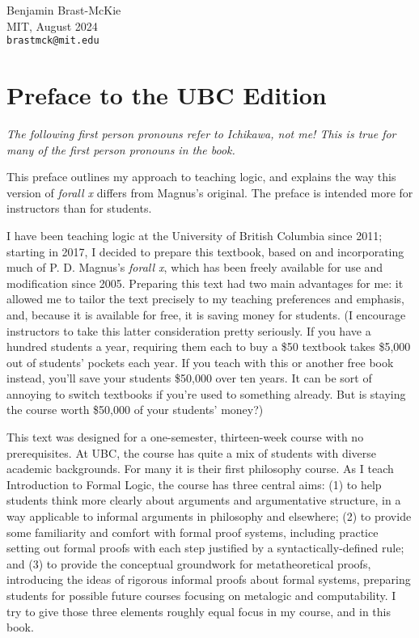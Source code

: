 \begin{flushright}
\textsf{Benjamin Brast-McKie} \\
\textsf{MIT, August 2024} \\
\texttt{brastmck@mit.edu}
\end{flushright}


\iffalse

\chapter*{Preface to the UBC Edition}
\label{ch.preface}

\textit{The following first person pronouns refer to Ichikawa, not me! This is true for many of the first person pronouns in the book.}

This preface outlines my approach to teaching logic, and explains the way this version of \emph{forall x} differs from Magnus's original. The preface is intended more for instructors than for students. 

I have been teaching logic at the University of British Columbia since 2011; starting in 2017, I decided to prepare this textbook, based on and incorporating much of P. D. Magnus's \emph{forall x}, which has been freely available for use and modification since 2005. Preparing this text had two main advantages for me: it allowed me to tailor the text precisely to my teaching preferences and emphasis, and, because it is available for free, it is saving money for students. (I encourage instructors to take this latter consideration pretty seriously. If you have a hundred students a year, requiring them each to buy a \$50 textbook takes \$5,000 out of students' pockets each year. If you teach with this or another free book instead, you'll save your students \$50,000 over ten years. It can be sort of annoying to switch textbooks if you're used to something already. But is staying the course worth \$50,000 of your students' money?)

This text was designed for a one-semester, thirteen-week course with no prerequisites. At UBC, the course has quite a mix of students with diverse academic backgrounds. For many it is their first philosophy course. As I teach Introduction to Formal Logic, the course has three central aims: (1) to help students think more clearly about arguments and argumentative structure, in a way applicable to informal arguments in philosophy and elsewhere; (2) to provide some familiarity and comfort with formal proof systems, including practice setting out formal proofs with each step justified by a syntactically-defined rule; and (3) to provide the conceptual groundwork for metatheoretical proofs, introducing the ideas of rigorous informal proofs about formal systems, preparing students for possible future courses focusing on metalogic and computability. I try to give those three elements roughly equal focus in my course, and in this book.

